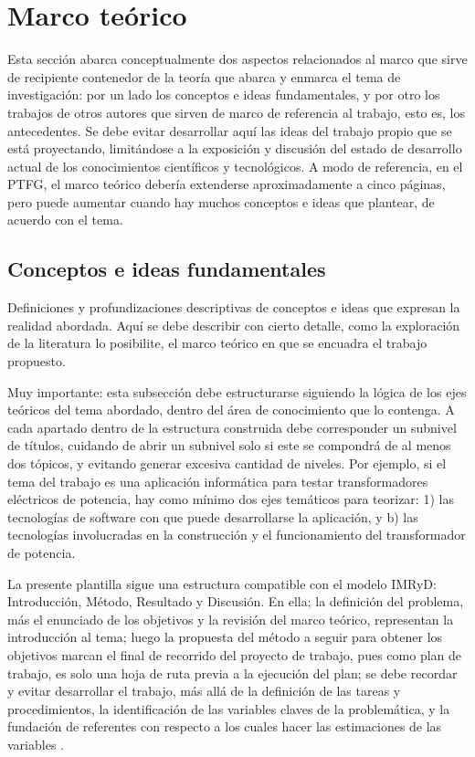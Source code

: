 \documentclass[12pt,a4paper]{article}
\begin{document}
\section{Marco teórico}
Esta sección abarca conceptualmente dos aspectos relacionados al marco que sirve de recipiente contenedor de la teoría que abarca y enmarca el tema de investigación: por un lado los conceptos e ideas fundamentales, y por otro los trabajos de otros autores que sirven de marco de referencia al trabajo, esto es, los antecedentes. Se debe evitar desarrollar aquí las ideas del trabajo propio que se está proyectando, limitándose a la exposición y discusión del estado de desarrollo actual de los conocimientos científicos y tecnológicos. A modo de referencia, en el  PTFG, el marco teórico debería extenderse aproximadamente a cinco páginas, pero puede aumentar cuando hay muchos conceptos e ideas que plantear, de acuerdo con el tema.

\subsection{Conceptos e ideas fundamentales}
Definiciones y profundizaciones descriptivas de conceptos e ideas que expresan la realidad abordada. Aquí se debe describir con cierto detalle, como la exploración de la literatura lo posibilite, el marco teórico en que se encuadra el trabajo propuesto.

Muy importante: esta subsección debe estructurarse siguiendo la lógica de los ejes teóricos del tema abordado, dentro del área de conocimiento que lo contenga. A cada apartado dentro de la estructura construida debe corresponder un subnivel de títulos, cuidando de abrir un subnivel solo si este se compondrá de al menos dos tópicos, y evitando generar excesiva cantidad de niveles. Por ejemplo, si el tema del trabajo es una aplicación informática para testar transformadores eléctricos de potencia, hay como  mínimo dos ejes temáticos para teorizar: 1) las tecnologías de software con que puede desarrollarse la aplicación, y b) las tecnologías involucradas en la construcción y el funcionamiento del transformador de potencia.

La presente plantilla sigue una estructura compatible con el modelo IMRyD: Introducción, Método, Resultado y Discusión. En ella; la definición del problema, más el enunciado de los objetivos y la revisión del marco teórico, representan la introducción al tema; luego la propuesta del método a seguir para obtener los objetivos marcan el final de recorrido del proyecto de trabajo, pues como plan de trabajo, es solo una hoja de ruta previa a la ejecución del plan; se debe recordar y evitar desarrollar el trabajo, más allá de la definición de las tareas y procedimientos, la identificación de las variables claves de la problemática, y la fundación de referentes con respecto a los cuales hacer las estimaciones de las variables \cite{aacp}.
\end{document}
